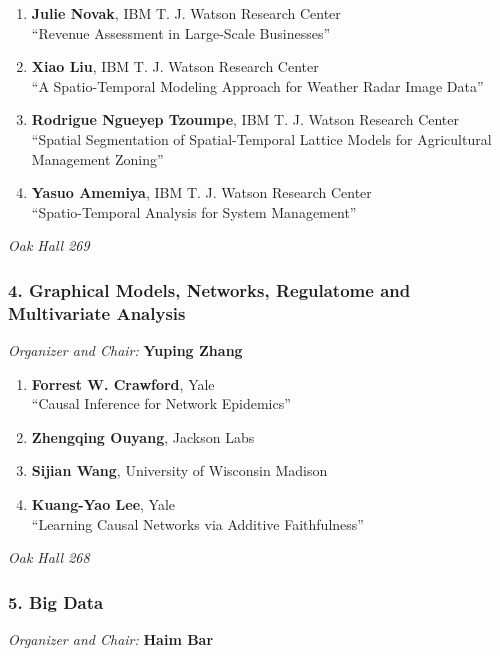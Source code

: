 \begin{enumerate}
\item \textbf{Julie Novak}, IBM T. J. Watson Research Center \\
``Revenue Assessment in Large-Scale Businesses''
\item \textbf{Xiao Liu}, IBM T. J. Watson Research Center \\
``A Spatio-Temporal Modeling Approach for Weather Radar Image Data''
\item \textbf{Rodrigue Ngueyep Tzoumpe}, IBM T. J. Watson Research Center  \\
``Spatial Segmentation of Spatial-Temporal Lattice Models for Agricultural Management Zoning''
\item \textbf{Yasuo Amemiya}, IBM T. J. Watson Research Center \\
``Spatio-Temporal Analysis for System Management''
\end{enumerate}

\emph{Oak Hall 269} \\[.5em]

\subsubsection*{4. Graphical Models, Networks, Regulatome and Multivariate Analysis}

\emph{Organizer and Chair:} \textbf{Yuping Zhang}

\begin{enumerate}
\item \textbf{Forrest W. Crawford}, Yale \\
``Causal Inference for Network Epidemics''
\item \textbf{Zhengqing Ouyang}, Jackson Labs 
\item \textbf{Sijian Wang}, University of Wisconsin Madison 
\item \textbf{Kuang-Yao Lee}, Yale \\
``Learning Causal Networks via Additive Faithfulness''
\end{enumerate}

\emph{Oak Hall 268} \\[.5em]

\subsubsection*{5. Big Data}

\emph{Organizer and Chair:} \textbf{Haim Bar}

